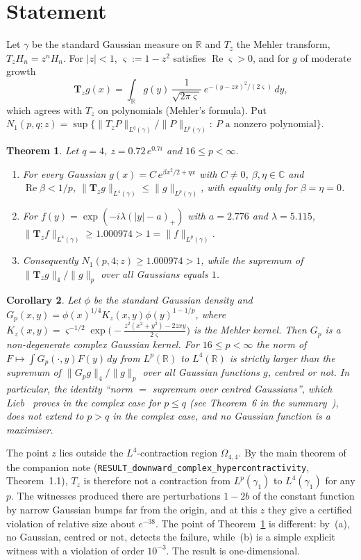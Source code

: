 \documentclass[11pt]{amsart}
\newtheorem{theorem}{Theorem}[section]
\newtheorem{corollary}[theorem]{Corollary}
\theoremstyle{definition}
\newcommand{\R}{\mathbb{R}}
\newcommand{\C}{\mathbb{C}}
\newcommand{\Rea}{\operatorname{Re}}
\newcommand{\bT}{\mathbf{T}}
\begin{document}
\section{Statement}
Let $\gamma$ be the standard Gaussian measure on $\R$ and $T_z$ the Mehler transform,
$T_zH_n=z^nH_n$. For $|z|<1$, $\varsigma:=1-z^2$ satisfies $\Rea\varsigma>0$, and for $g$ of moderate growth
\[
\bT_zg(x)=\int_\R g(y)\,\frac{1}{\sqrt{2\pi\varsigma}}\,e^{-(y-zx)^2/(2\varsigma)}\,dy,
\]
which agrees with $T_z$ on polynomials (Mehler's formula). Put
$N_1(p,q;z)=\sup\{\|T_zP\|_{L^q(\gamma)}/\|P\|_{L^p(\gamma)}:\ P \text{ a nonzero polynomial}\}$.

\begin{theorem}\label{thm:D}
Let $q=4$, $z=0.72\,e^{0.7i}$ and $16\le p<\infty$.
\begin{enumerate}[label=(\alph*)]
\item For every Gaussian $g(x)=C\,e^{\beta x^2/2+\eta x}$ with $C\ne0$, $\beta,\eta\in\C$ and $\Rea\beta<1/p$,
$\|\bT_zg\|_{L^4(\gamma)}\le\|g\|_{L^p(\gamma)}$, with equality only for $\beta=\eta=0$.
\item For $f(y)=\exp(-i\lambda(|y|-a)_+)$ with $a=2.776$ and $\lambda=5.115$,
$\|\bT_zf\|_{L^4(\gamma)}\ge1.000974>1=\|f\|_{L^p(\gamma)}$.
\item Consequently $N_1(p,4;z)\ge1.000974>1$, while the supremum of $\|\bT_zg\|_4/\|g\|_p$ over all Gaussians
equals $1$.
\end{enumerate}
\end{theorem}

\begin{corollary}\label{cor:lieb}
Let $\phi$ be the standard Gaussian density and
$G_p(x,y)=\phi(x)^{1/4}K_z(x,y)\phi(y)^{1-1/p}$, where
$K_z(x,y)=\varsigma^{-1/2}\exp\big(-\frac{z^2(x^2+y^2)-2zxy}{2\varsigma}\big)$ is the Mehler kernel. Then
$G_p$ is a non-degenerate complex Gaussian kernel. For $16\le p<\infty$ the norm of
$F\mapsto\int G_p(\cdot,y)F(y)\,dy$ from $L^p(\R)$ to $L^4(\R)$ is strictly larger than the supremum of
$\|G_pg\|_4/\|g\|_p$ over all Gaussian functions $g$, centred or not. In particular, the identity ``norm $=$ supremum
over centred Gaussians'', which Lieb~\cite{Lieb90} proves in the complex case for $p\le q$ (see Theorem~6 in the
summary~\cite{Durcik}), does not extend to $p>q$ in the complex case, and no Gaussian function is a maximiser.
\end{corollary}

The point $z$ lies outside the $L^4$-contraction region $\Omega_{4,4}$. By the main theorem of the companion note
(\texttt{RESULT\_downward\_complex\_\allowbreak hypercontractivity}, Theorem~1.1), $T_z$ is therefore not a contraction
from $L^p(\gamma_1)$ to $L^4(\gamma_1)$ for any $p$. The witnesses produced there are perturbations $1-2b$ of the
constant function by narrow Gaussian bumps far from the origin, and at this $z$ they give a certified violation of
relative size about $e^{-38}$. The point of Theorem~\ref{thm:D} is different: by~(a), no Gaussian, centred or not, detects
the failure, while~(b) is a simple explicit witness with a violation of order
$10^{-3}$. The result is one-dimensional.
\end{document}
